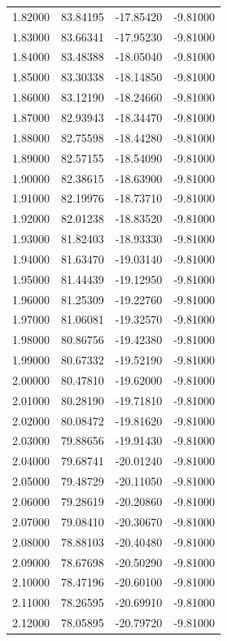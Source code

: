 \begin{table}
\begin{tabular}{llll}
1.82000 & 83.84195 & -17.85420 & -9.81000 \\
1.83000 & 83.66341 & -17.95230 & -9.81000 \\
1.84000 & 83.48388 & -18.05040 & -9.81000 \\
1.85000 & 83.30338 & -18.14850 & -9.81000 \\
1.86000 & 83.12190 & -18.24660 & -9.81000 \\
1.87000 & 82.93943 & -18.34470 & -9.81000 \\
1.88000 & 82.75598 & -18.44280 & -9.81000 \\
1.89000 & 82.57155 & -18.54090 & -9.81000 \\
1.90000 & 82.38615 & -18.63900 & -9.81000 \\
1.91000 & 82.19976 & -18.73710 & -9.81000 \\
1.92000 & 82.01238 & -18.83520 & -9.81000 \\
1.93000 & 81.82403 & -18.93330 & -9.81000 \\
1.94000 & 81.63470 & -19.03140 & -9.81000 \\
1.95000 & 81.44439 & -19.12950 & -9.81000 \\
1.96000 & 81.25309 & -19.22760 & -9.81000 \\
1.97000 & 81.06081 & -19.32570 & -9.81000 \\
1.98000 & 80.86756 & -19.42380 & -9.81000 \\
1.99000 & 80.67332 & -19.52190 & -9.81000 \\
2.00000 & 80.47810 & -19.62000 & -9.81000 \\
2.01000 & 80.28190 & -19.71810 & -9.81000 \\
2.02000 & 80.08472 & -19.81620 & -9.81000 \\
2.03000 & 79.88656 & -19.91430 & -9.81000 \\
2.04000 & 79.68741 & -20.01240 & -9.81000 \\
2.05000 & 79.48729 & -20.11050 & -9.81000 \\
2.06000 & 79.28619 & -20.20860 & -9.81000 \\
2.07000 & 79.08410 & -20.30670 & -9.81000 \\
2.08000 & 78.88103 & -20.40480 & -9.81000 \\
2.09000 & 78.67698 & -20.50290 & -9.81000 \\
2.10000 & 78.47196 & -20.60100 & -9.81000 \\
2.11000 & 78.26595 & -20.69910 & -9.81000 \\
2.12000 & 78.05895 & -20.79720 & -9.81000 \\

\end{tabular}
\end{table}
